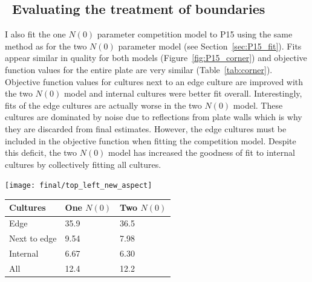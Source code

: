 \begin{multicols}{2}



\subsection{\thesubsection~Evaluating the treatment of boundaries}

I also fit the one \(N(0)\) parameter competition model to P15 using
the same method as for the two \(N(0)\) parameter model (see
Section~\ref{sec:P15_fit}). Fits appear similar in quality for both
models (Figure~\ref{fig:P15_corner}) and objective function values for
the entire plate are very similar (Table~\ref{tab:corner}). Objective
function values for cultures next to an edge culture are improved with
the two \(N(0)\) model and internal cultures were better fit
overall. Interestingly, fits of the edge cultures are actually worse
in the two \(N(0)\) model. These cultures are dominated by noise due
to reflections from plate walls which is why they are discarded from
final estimates. However, the edge cultures must be included in the
objective function when fitting the competition model. Despite this
deficit, the two \(N(0)\) model has increased the goodness of fit to
internal cultures by collectively fitting all cultures.


\graphicspath{{images/corners/}}
\begin{Figure}
  \centering
  \texttt{[image: final/top\_left\_new\_aspect]}
  \label{fig:P15_corner}
\end{Figure}


\begin{center}
  \begin{tabular}{l l l}
    \hline
    Cultures     & One \(N(0)\)  & Two \(N(0)\) \\
    \hline
    Edge         & 35.9    & 36.5\\
    Next to edge & 9.54    & 7.98\\
    Internal     & 6.67    & 6.30\\
    All          & 12.4    & 12.2\\
    \hline
  \end{tabular}
  \label{tab:corner}
\end{center}




\end{multicols}
